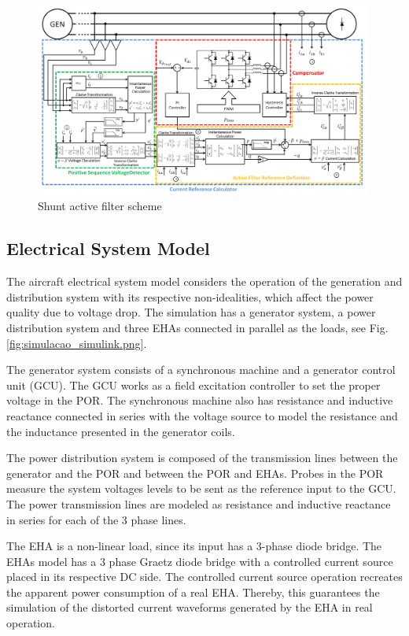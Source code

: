 \begin{figure}[!tb] %
	\centering
	\includegraphics[width=0.99\textwidth]{Figures/filtro_blocos_1.png}
	\caption{Shunt active filter scheme}
	\label{fig:filtro_blocos_1.png}
\end{figure}

\subsection{Electrical System Model}

The aircraft electrical system model considers the operation of the generation and distribution system with its respective non-idealities, which affect the power quality due to voltage drop. The simulation has a generator system, a power distribution system and three EHAs connected in parallel as the loads, see Fig. \ref{fig:simulacao_simulink.png}.

The generator system consists of a synchronous machine and a generator control unit (GCU). The GCU works as a field excitation controller to set the proper voltage in the POR. The synchronous machine also has resistance and inductive reactance connected in series with the voltage source to model the resistance and the inductance presented in the generator coils.

The power distribution system is composed of the transmission lines between the generator and the POR and between the POR and EHAs. Probes in the POR measure the system voltages levels to be sent as the reference input to the GCU. The power transmission lines are modeled as resistance and inductive reactance in series for each of the 3 phase lines.

The EHA is a non-linear load, since its input has a 3-phase diode bridge. The EHAs model has a 3 phase Graetz diode bridge with a controlled current source placed in its respective DC side. The controlled current source operation recreates the apparent power consumption of a real EHA. Thereby, this guarantees the simulation of the distorted current waveforms generated by the EHA in real operation.

